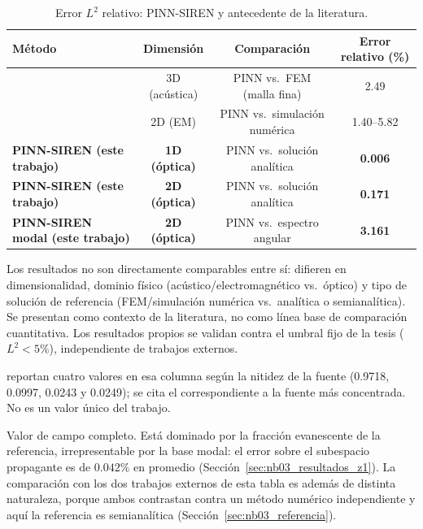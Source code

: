 \begin{table}[htbp]
\centering
\begin{threeparttable}
\caption{Error $L^2$ relativo: PINN-SIREN y antecedente de la literatura.}
\label{tab:comparativa}
\begin{tabular}{lccc}
\toprule
Método & Dimensión & Comparación & Error relativo (\%) \\
\midrule
\textcite{schoder2024helmholtz} & 3D (acústica) & PINN vs.\ FEM (malla fina) & 2.49\tnote{b} \\
\textcite{zhang2025fepirbn} & 2D (EM) & PINN vs.\ simulación numérica & 1.40--5.82\tnote{c} \\
\textbf{PINN-SIREN (este trabajo)} & \textbf{1D (óptica)} & PINN vs.\ solución analítica & \textbf{0.006} \\
\textbf{PINN-SIREN (este trabajo)} & \textbf{2D (óptica)} & PINN vs.\ solución analítica & \textbf{0.171} \\
\textbf{PINN-SIREN modal (este trabajo)} & \textbf{2D (óptica)} & PINN vs.\ espectro angular & \textbf{3.161}\tnote{a} \\
\bottomrule
\end{tabular}
\begin{tablenotes}\small
    \item Los resultados no son directamente comparables entre sí: difieren en
    dimensionalidad, dominio físico (acústico/electromagnético vs.\ óptico) y
    tipo de solución de referencia (FEM/simulación numérica vs.\ analítica o
    semianalítica). Se presentan como contexto de la literatura, no como línea
    base de comparación cuantitativa. Los resultados propios se validan
    contra el umbral fijo de la tesis ($L^2 < 5\%$), independiente de
    trabajos externos.
    \item[b] \textcite{schoder2024helmholtz} reportan cuatro valores en esa
    columna según la nitidez de la fuente (0.9718, 0.0997, 0.0243 y 0.0249); se
    cita el correspondiente a la fuente más concentrada. No es un valor único
    del trabajo.
    \item[a] Valor de campo completo. Está dominado por la fracción evanescente
    de la referencia, irrepresentable por la base modal: el error sobre el
    subespacio propagante es de $0.042\%$ en promedio
    (Sección~\ref{sec:nb03_resultados_z1}). La comparación con los dos trabajos
    externos de esta tabla es además de distinta naturaleza, porque ambos
    contrastan contra un método numérico independiente y aquí la referencia es
    semianalítica (Sección~\ref{sec:nb03_referencia}).

\end{tablenotes}
\end{threeparttable}
\end{table}
